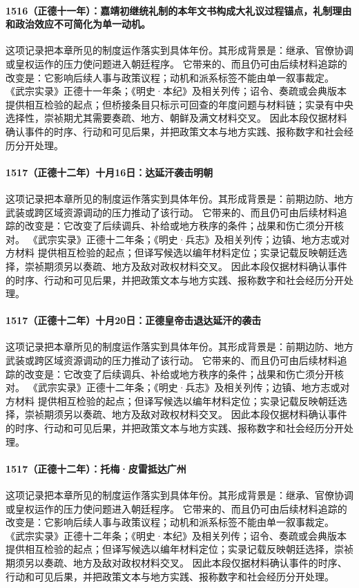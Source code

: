 \paragraph{1516（正德十一年）：嘉靖初继统礼制的本年文书构成大礼议过程锚点，礼制理由和政治效应不可简化为单一动机。} 这项记录把本章所见的制度运作落实到具体年份。其形成背景是：继承、官僚协调或皇权运作的压力使问题进入朝廷程序。 它带来的、而且仍可由后续材料追踪的改变是：它影响后续人事与政策议程；动机和派系标签不能由单一叙事裁定。 《武宗实录》正德十一年条；《明史·本纪》及相关列传；诏令、奏疏或会典版本 提供相互检验的起点；但桥接条目只标示可回查的年度问题与材料链；实录有中央选择性，崇祯期尤其需要奏疏、地方、朝鲜及满文材料交叉。 因此本段仅据材料确认事件的时序、行动和可见后果，并把政策文本与地方实践、报称数字和社会经历分开处理。

\paragraph{1517（正德十二年）十月16日：达延汗袭击明朝} 这项记录把本章所见的制度运作落实到具体年份。其形成背景是：前期边防、地方武装或跨区域资源调动的压力推动了该行动。 它带来的、而且仍可由后续材料追踪的改变是：它改变了后续调兵、补给或地方秩序的条件；战果和伤亡须分开核对。 《武宗实录》正德十二年条；《明史·兵志》及相关列传；边镇、地方志或对方材料 提供相互检验的起点；但译写候选以编年材料定位；实录记载反映朝廷选择，崇祯期须另以奏疏、地方及敌对政权材料交叉。 因此本段仅据材料确认事件的时序、行动和可见后果，并把政策文本与地方实践、报称数字和社会经历分开处理。

\paragraph{1517（正德十二年）十月20日：正德皇帝击退达延汗的袭击} 这项记录把本章所见的制度运作落实到具体年份。其形成背景是：前期边防、地方武装或跨区域资源调动的压力推动了该行动。 它带来的、而且仍可由后续材料追踪的改变是：它改变了后续调兵、补给或地方秩序的条件；战果和伤亡须分开核对。 《武宗实录》正德十二年条；《明史·兵志》及相关列传；边镇、地方志或对方材料 提供相互检验的起点；但译写候选以编年材料定位；实录记载反映朝廷选择，崇祯期须另以奏疏、地方及敌对政权材料交叉。 因此本段仅据材料确认事件的时序、行动和可见后果，并把政策文本与地方实践、报称数字和社会经历分开处理。

\paragraph{1517（正德十二年）：托梅·皮雷抵达广州} 这项记录把本章所见的制度运作落实到具体年份。其形成背景是：继承、官僚协调或皇权运作的压力使问题进入朝廷程序。 它带来的、而且仍可由后续材料追踪的改变是：它影响后续人事与政策议程；动机和派系标签不能由单一叙事裁定。 《武宗实录》正德十二年条；《明史·本纪》及相关列传；诏令、奏疏或会典版本 提供相互检验的起点；但译写候选以编年材料定位；实录记载反映朝廷选择，崇祯期须另以奏疏、地方及敌对政权材料交叉。 因此本段仅据材料确认事件的时序、行动和可见后果，并把政策文本与地方实践、报称数字和社会经历分开处理。

